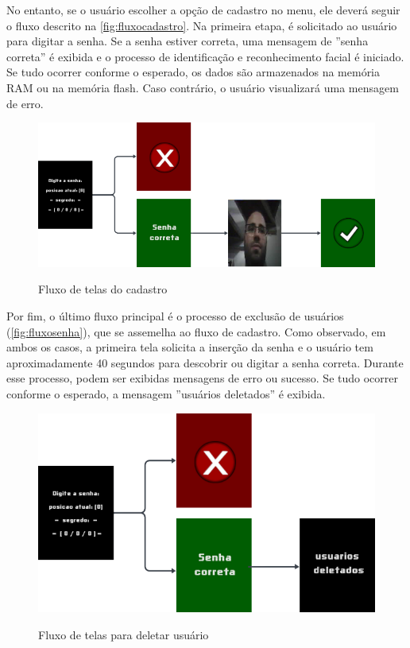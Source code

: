 No entanto, se o usuário escolher a opção de cadastro no menu, 
ele deverá seguir o fluxo descrito na \autoref{fig:fluxocadastro}. 
Na primeira etapa, é solicitado ao usuário para digitar a senha. 
Se a senha estiver correta, uma mensagem de ''senha correta'' é 
exibida e o processo de identificação e reconhecimento facial 
é iniciado. Se tudo ocorrer conforme o esperado, os dados são 
armazenados na memória RAM ou na memória flash. Caso contrário, 
o usuário visualizará uma mensagem de erro.

\begin{figure}[h!]
    \centering
    \caption{Fluxo de telas do cadastro}
    \includegraphics[scale=2]{figuras/fluxo_cadastro.png}
    \fonte{}%
    \label{fig:fluxocadastro}
    \centering
\end{figure}


Por fim, o último fluxo principal é o processo de exclusão 
de usuários (\autoref{fig:fluxosenha}), que se assemelha 
ao fluxo de cadastro. Como observado, em ambos 
os casos, a primeira tela solicita a inserção 
da senha e o usuário tem aproximadamente 40 segundos 
para descobrir ou digitar a senha correta. Durante esse processo, 
podem ser exibidas mensagens de erro ou sucesso. Se tudo ocorrer 
conforme o esperado, a mensagem ''usuários deletados'' é exibida.

\begin{figure}[h!]
    \centering
    \caption{Fluxo de telas para deletar usuário}
    \includegraphics[scale=1.8]{figuras/fluxo_deletar_usuario.png}
    \fonte{}%
    \label{fig:fluxosenha}
    \centering
\end{figure}

